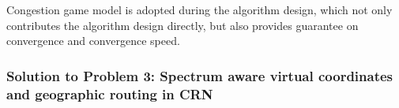 Congestion game model is adopted during the algorithm design, which not only contributes the algorithm design directly, but also provides guarantee on convergence and convergence speed.








\subsubsection{Solution to Problem 3: Spectrum aware virtual coordinates and geographic routing in CRN}

